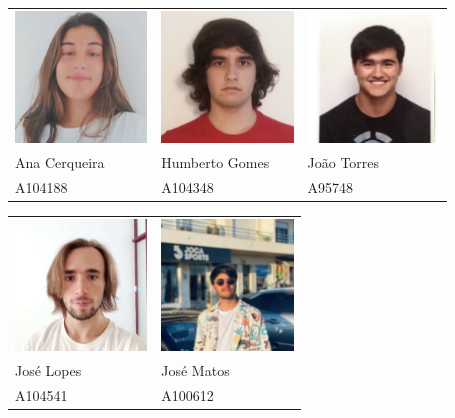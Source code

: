 \documentclass[12pt, a4paper]{article}
\begin{document}
\vspace{2cm}
\begin{center}
    \begin{tabular}{>{\centering}p{}
                    >{\centering}p{}
                    >{\centering\arraybackslash}p{}}
        \includegraphics[width=3.5cm]{Imagens/Capa/A104188.png} &
        \includegraphics[width=3.5cm]{Imagens/Capa/A104348.png} &
        \includegraphics[width=3.5cm]{Imagens/Capa/A95748.png}  \\

        Ana Cerqueira & Humberto Gomes & João Torres \\
        A104188       & A104348        & A95748
    \end{tabular}

    \begin{tabular}{>{\centering}p{}
                    >{\centering\arraybackslash}p{}}
        \includegraphics[width=3.5cm]{Imagens/Capa/A104541.png} &
        \includegraphics[width=3.5cm]{Imagens/Capa/A100612.png} \\

        José Lopes & José Matos \\
        A104541    & A100612
    \end{tabular}
\end{center}
\end{document}
